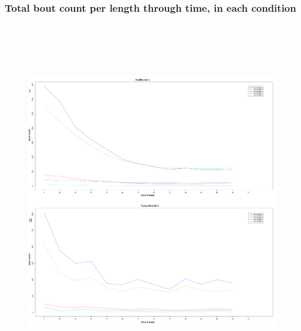 \documentclass[a4paper,12pt]{article}
\begin{document}
\subsubsection{Total bout count per length through time, in each condition}

\begin{figure}[h!]
\begin{center}
\includegraphics[width=15cm,height=16cm]{countChangeTime1.png}
\end{center}
\end{figure}
\newpage
\end{document}
